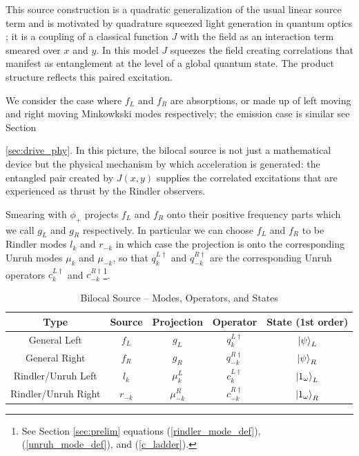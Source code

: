 \documentclass[12pt,a4paper]{article}
\begin{document}
This source construction is a quadratic generalization of the usual linear source term \cite{Schwinger_1966} \cite{ryder1996quantum} and is motivated by quadrature squeezed light generation in quantum optics \cite{gerry2023introductory}; it is a coupling of a classical function $J$ with the field as an interaction term smeared over $x$ and $y$. In this model $J$ squeezes the field creating correlations that manifest as entanglement at the level of a global quantum state. The product structure reflects this paired excitation.

We consider the case where $f_L$ and $f_R$ are absorptions, or made up of left moving and right moving Minkowkski modes respectively; the emission case is similar see Section {\ref{sec:drive_phy}. In this picture, the bilocal source is not just a mathematical device but the physical mechanism by which acceleration is generated: the entangled pair created by $J(x,y)$ supplies the correlated excitations that are experienced as thrust by the Rindler observers.


Smearing with $\phi_+$ projects $f_L$ and $f_R$ onto their positive frequency parts which we call $g_L$ and $g_R$ respectively. In particular we can choose $f_L$ and $f_R$ to be Rindler modes $l_k$ and $r_{-k}$ in which case the projection is onto the corresponding Unruh modes $\mu_k$ and $\mu_{-k}$, so that $q_{k}^{L\dagger}$ and $q_{-k}^{R\dagger}$ are the corresponding Unruh operators $c_{k}^{L\dagger}$ and $c_{-k}^{R\dagger}$\footnote{See Section \ref{sec:prelim} equations (\ref{rindler_mode_def}), (\ref{unruh_mode_def}), and (\ref{c_ladder}).}.  

\begin{table}[ht]
\caption{Bilocal Source -- Modes, Operators, and States}
\centering
\begin{tabular}{c c c c c} %
\hline\hline
Type & Source & Projection & Operator & State (1st order)\\ [0.5ex] %
\hline %
General Left & $f_L$ & $g_L$ & $q_{k}^{L\dagger}$ & $\ket{\psi}_{L}$\\
General Right & $f_R$ & $g_R$ & $q_{-k}^{R\dagger}$  & $\ket{\psi}_{R}$\\
Rindler/Unruh Left & $l_{k}$ & $\mu_{k}^L$ & $c_{k}^{L\dagger}$ & $\ket{1_\omega}_{L}$\\
Rindler/Unruh Right & $r_{-k}$ & $\mu_{-k}^R$ & $c_{-k}^{R\dagger}$ & $\ket{1_\omega}_{R}$\\
\hline %
\end{tabular}
\label{table:modes}
\end{table}

}
\end{document}
